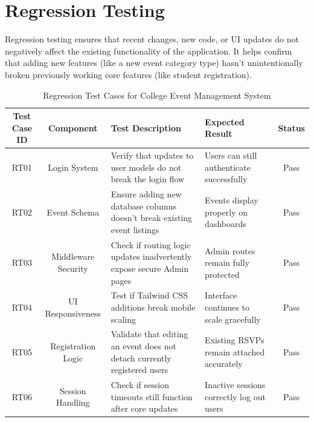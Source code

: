 \section{Regression Testing}
Regression testing ensures that recent changes, new code, or UI updates do not negatively affect the existing functionality of the application. It helps confirm that adding new features (like a new event category type) hasn't unintentionally broken previously working core features (like student registration).
\begin{table}[H]
    \centering
    \renewcommand{\arraystretch}{1.3}
    \small
    \begin{tabular}{|c|c|p{3cm}|p{3cm}|c|}
        \hline
        \textbf{Test Case ID} & \textbf{Component} & \textbf{Test Description} & \textbf{Expected Result} & \textbf{Status} \\
        \hline
        RT01 & Login System & \raggedright Verify that updates to user models do not break the login flow & \raggedright Users can still authenticate successfully & Pass \\
        \hline
        RT02 & Event Schema & \raggedright Ensure adding new database columns doesn’t break existing event listings & \raggedright Events display properly on dashboards & Pass \\
        \hline
        RT03 & Middleware Security & \raggedright Check if routing logic updates inadvertently expose secure Admin pages & \raggedright Admin routes remain fully protected & Pass \\
        \hline
        RT04 & UI Responsiveness & \raggedright Test if Tailwind CSS additions break mobile scaling & \raggedright Interface continues to scale gracefully & Pass \\
        \hline
        RT05 & Registration Logic & \raggedright Validate that editing an event does not detach currently registered users & \raggedright Existing RSVPs remain attached accurately & Pass \\
        \hline
        RT06 & Session Handling & \raggedright Check if session timeouts still function after core updates & \raggedright Inactive sessions correctly log out users & Pass \\
        \hline
    \end{tabular}
    \caption{Regression Test Cases for College Event Management System}
    \label{tab:regression_tests}
\end{table}

\newpage
